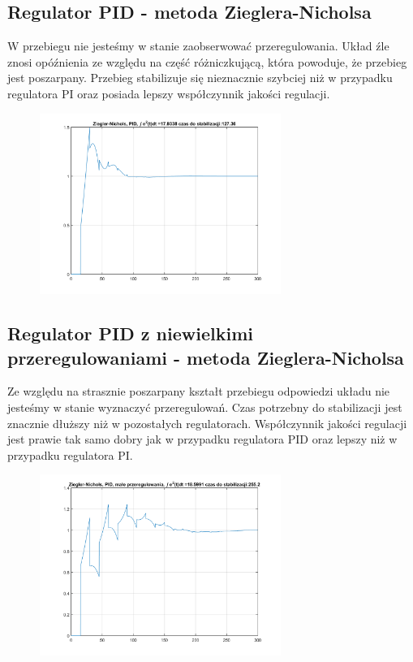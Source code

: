 \documentclass[a4paper, 12pt]{article}
\begin{document}
		\subsection{Regulator PID - metoda Zieglera-Nicholsa}
			W przebiegu nie jesteśmy w stanie zaobserwować przeregulowania. Układ źle znosi opóźnienia ze względu na część różniczkującą, która powoduje, że przebieg jest poszarpany. Przebieg stabilizuje się nieznacznie szybciej niż w przypadku regulatora PI oraz posiada lepszy współczynnik jakości regulacji.
			\begin{figure}[H]
				\centering
				\includegraphics[width = 0.7\textwidth]{./img/ZN_PID.png}
			\end{figure}
		\subsection{Regulator PID z niewielkimi przeregulowaniami - metoda Zieglera-Nicholsa}	
			Ze względu na strasznie poszarpany kształt przebiegu odpowiedzi układu nie jesteśmy w stanie wyznaczyć przeregulowań. Czas potrzebny do stabilizacji jest znacznie dłuższy niż w pozostałych regulatorach. Współczynnik jakości regulacji jest prawie tak samo dobry jak w przypadku regulatora PID oraz lepszy niż w przypadku regulatora PI.
			\begin{figure}[H]
				\centering
				\includegraphics[width = 0.7\textwidth]{./img/ZN_PID_small.png}
			\end{figure}
\end{document}

